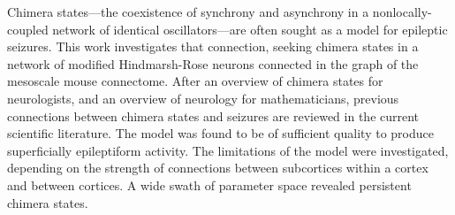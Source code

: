 Chimera states---the coexistence of synchrony and asynchrony in a nonlocally-coupled network of identical oscillators---are often sought as a model for epileptic seizures.
This work investigates that connection, seeking chimera states in a network of modified Hindmarsh-Rose neurons connected in the graph of the mesoscale mouse connectome.
After an overview of chimera states for neurologists,
and an overview of neurology for mathematicians,
previous connections between chimera states and seizures are reviewed in the current scientific literature.
The model was found to be of sufficient quality to produce superficially epileptiform activity.
The limitations of the model were investigated, depending on the strength of connections between subcortices within a cortex and between cortices.
A wide swath of parameter space revealed persistent chimera states.
